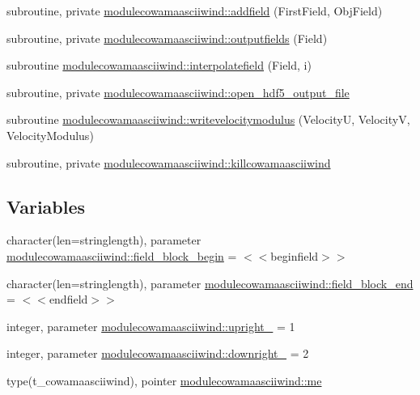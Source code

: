 \begin{DoxyCompactItemize}
\item 
subroutine, private \mbox{\hyperlink{namespacemodulecowamaasciiwind_a340e2d839a8a04ceb31a4beae499e21a}{modulecowamaasciiwind\+::addfield}} (First\+Field, Obj\+Field)
\item 
subroutine, private \mbox{\hyperlink{namespacemodulecowamaasciiwind_a67476e8fa757d63b3e48664bcc8b1b96}{modulecowamaasciiwind\+::outputfields}} (Field)
\item 
subroutine \mbox{\hyperlink{namespacemodulecowamaasciiwind_a3a43fe146a563746fe8d8ed4fb89732c}{modulecowamaasciiwind\+::interpolatefield}} (Field, i)
\item 
subroutine, private \mbox{\hyperlink{namespacemodulecowamaasciiwind_aea5f2ecc6c72b859765645c42c117f81}{modulecowamaasciiwind\+::open\+\_\+hdf5\+\_\+output\+\_\+file}}
\item 
subroutine \mbox{\hyperlink{namespacemodulecowamaasciiwind_af4f03b22c10470dbdcdaa2f8ab7713d9}{modulecowamaasciiwind\+::writevelocitymodulus}} (VelocityU, VelocityV, Velocity\+Modulus)
\item 
subroutine, private \mbox{\hyperlink{namespacemodulecowamaasciiwind_a23a57a057fbbc4351c19799391d3736b}{modulecowamaasciiwind\+::killcowamaasciiwind}}
\end{DoxyCompactItemize}
\subsection*{Variables}
\begin{DoxyCompactItemize}
\item 
character(len=stringlength), parameter \mbox{\hyperlink{namespacemodulecowamaasciiwind_a1178a80523317c2c8a9ccd40ccf90e45}{modulecowamaasciiwind\+::field\+\_\+block\+\_\+begin}} = \textquotesingle{}$<$$<$beginfield$>$$>$\textquotesingle{}
\item 
character(len=stringlength), parameter \mbox{\hyperlink{namespacemodulecowamaasciiwind_a161fd86ec10f57025d009b25ac4e6186}{modulecowamaasciiwind\+::field\+\_\+block\+\_\+end}} = \textquotesingle{}$<$$<$endfield$>$$>$\textquotesingle{}
\item 
integer, parameter \mbox{\hyperlink{namespacemodulecowamaasciiwind_aeec465400026a2de4132b8649e10a8e8}{modulecowamaasciiwind\+::upright\+\_\+}} = 1
\item 
integer, parameter \mbox{\hyperlink{namespacemodulecowamaasciiwind_a67c52eb5a4004f3fce04141135430ceb}{modulecowamaasciiwind\+::downright\+\_\+}} = 2
\item 
type(t\+\_\+cowamaasciiwind), pointer \mbox{\hyperlink{namespacemodulecowamaasciiwind_af2e1e1fb6a310103abe149dc2b8b232e}{modulecowamaasciiwind\+::me}}
\end{DoxyCompactItemize}
